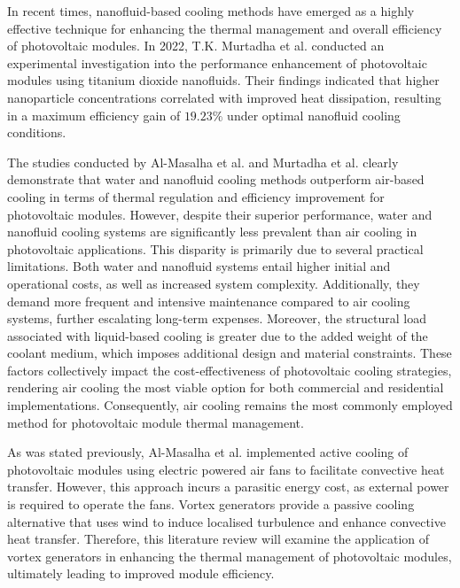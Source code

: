 In recent times, nanofluid-based cooling methods have emerged as a highly effective technique for enhancing the thermal management and overall efficiency of photovoltaic modules. In 2022, T.K. Murtadha et al. conducted an experimental investigation into the performance enhancement of photovoltaic modules using titanium dioxide nanofluids. Their findings indicated that higher nanoparticle concentrations correlated with improved heat dissipation, resulting in a maximum efficiency gain of $19.23\%$ under optimal nanofluid cooling conditions. \cite{Murtadha2022ImprovingNanofluid}\vspace{0.5em}

The studies conducted by Al-Masalha et al. \cite{Al-Masalha2024ImprovingSystems} and Murtadha et al. \cite{Murtadha2022ImprovingNanofluid} clearly demonstrate that water and nanofluid cooling methods outperform air-based cooling in terms of thermal regulation and efficiency improvement for photovoltaic modules. However, despite their superior performance, water and nanofluid cooling systems are significantly less prevalent than air cooling in photovoltaic applications. This disparity is primarily due to several practical limitations. Both water and nanofluid systems entail higher initial and operational costs, as well as increased system complexity. \cite{Dwivedi2020AdvancedArt, Suresh2018RoleEfficiency} Additionally, they demand more frequent and intensive maintenance compared to air cooling systems, further escalating long-term expenses. \cite{Samykano2023HybridApplications, Ponticorvo2022FoulingFluid} Moreover, the structural load associated with liquid-based cooling is greater due to the added weight of the coolant medium, which imposes additional design and material constraints. \cite{Sakanova2016InvestigationAircraft} These factors collectively impact the cost-effectiveness of photovoltaic cooling strategies, rendering air cooling the most viable option for both commercial and residential implementations. Consequently, air cooling remains the most commonly employed method for photovoltaic module thermal management. \cite{Dwivedi2020AdvancedArt} \vspace{0.5em}

As was stated previously, Al-Masalha et al. implemented active cooling of photovoltaic modules using electric powered air fans to facilitate convective heat transfer. \cite{Al-Masalha2024ImprovingSystems} However, this approach incurs a parasitic energy cost, as external power is required to operate the fans. Vortex generators provide a passive cooling alternative that uses wind to induce localised turbulence and enhance convective heat transfer. Therefore, this literature review will examine the application of vortex generators in enhancing the thermal management of photovoltaic modules, ultimately leading to improved module efficiency.

